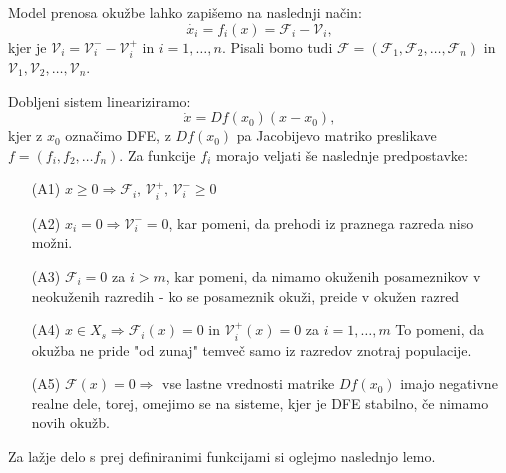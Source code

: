 \documentclass[a4paper,12pt]{article}
\newcommand{\F}{\mathcal F}
\newcommand{\V}{\mathcal V}
\begin{document}
Model prenosa okužbe lahko zapišemo na naslednji način:
\begin{equation} \label{eq1}
\dot{x_i}=f_i(x)=\F_i - \V_i,
\end{equation}
kjer je \(\V_i=\V_i^- - \V_i^+\) in \(i=1,\ldots,n\). 
Pisali bomo tudi \(\F=(\F_1,\F_2,\ldots,\F_n)\) in \(\V_1,\V_2,\ldots,\V_n\).

Dobljeni sistem lineariziramo:
\begin{equation} \label{eq2}
\dot{x}=Df(x_0)(x-x_0),
\end{equation}
kjer z \(x_0\) označimo DFE, z \(Df(x_0)\) pa Jacobijevo matriko preslikave 
\(f=(f_i, f_2, \ldots f_n)\).
Za funkcije \(f_i\)
morajo veljati še naslednje predpostavke:

\begin{itemize}
    \item[(A1)] \(x\geq 0 \Rightarrow \F_i\textrm{, }\V_i^+\textrm{, }\V_i^- \geq 0\)
    \item[(A2)] \(x_i=0 \Rightarrow \V_i^- =0\), kar pomeni, da prehodi iz praznega 
    razreda niso možni. 
    \item[(A3)] \(\F_i=0\) za \(i>m\), kar pomeni, da nimamo okuženih posameznikov v neokuženih razredih - 
    ko se posameznik okuži, preide v okužen razred 
    \item[(A4)] \(x\in X_s \Rightarrow \F_i(x)=0\) in \(\V_i^+(x)=0\) za \(i=1,\ldots,m\)
    To pomeni, da okužba ne pride "od zunaj" temveč samo iz razredov znotraj populacije. 
    \item[(A5)] \(\F(x)=0 \Rightarrow\) vse lastne vrednosti matrike \(Df(x_0)\) imajo 
    negativne realne dele, torej, omejimo se na sisteme, kjer je DFE stabilno, če nimamo novih okužb.    
\end{itemize}

Za lažje delo s prej definiranimi funkcijami si oglejmo naslednjo lemo.
\end{document}
